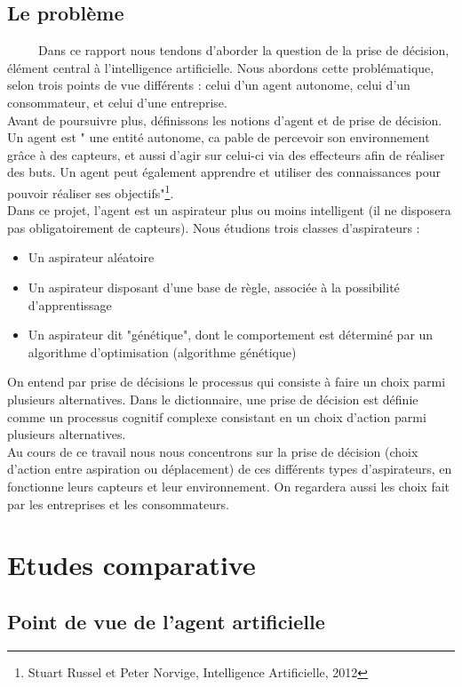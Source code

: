 \documentclass[a4paper,12pt]{report}
\begin{document}
\subsection{Le problème}
\ \ \ \ \ Dans ce rapport nous tendons d'aborder la question de la prise de décision, élément central à l'intelligence artificielle. Nous abordons cette problématique, selon trois points de vue différents : celui d'un agent autonome, celui d'un consommateur, et celui d'une entreprise. \\
Avant de poursuivre plus, définissons les notions d'agent et de prise de décision. \\
Un agent est " une entité autonome, ca pable de percevoir son environnement grâce à des capteurs, et aussi d'agir sur celui-ci via des effecteurs afin de réaliser des buts. Un agent peut également apprendre et utiliser des connaissances pour pouvoir réaliser ses objectifs"\footnote{Stuart Russel et Peter Norvige, Intelligence Artificielle, 2012}.\\
Dans ce projet, l'agent est un aspirateur plus ou moins intelligent (il ne disposera pas obligatoirement de capteurs). Nous étudions trois classes d'aspirateurs : 
\begin{itemize}
\item Un aspirateur aléatoire
\item Un aspirateur disposant d'une base de règle, associée à la possibilité d'apprentissage
\item Un aspirateur dit "génétique", dont le comportement est déterminé par un algorithme d'optimisation (algorithme génétique)
\end{itemize}
On entend par prise de décisions le processus qui consiste à faire un choix parmi plusieurs alternatives.
Dans le dictionnaire, une prise de décision est définie comme un processus cognitif complexe consistant en un choix d'action parmi plusieurs alternatives. \\
Au cours de ce travail nous nous concentrons sur la prise de décision (choix d'action entre aspiration ou déplacement) de ces différents types d'aspirateurs, en fonctionne leurs capteurs et leur environnement. On regardera aussi les choix fait par les entreprises et les consommateurs. 
\section{Etudes comparative}
\subsection{Point de vue de l'agent artificielle }
\end{document}
